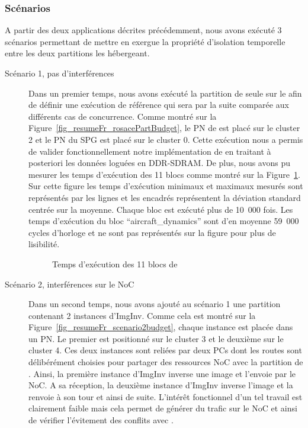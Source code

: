 \documentclass[main.tex]{subfiles}
\begin{document}
\subsubsection{Scénarios}
A partir des deux applications décrites précédemment, nous avons exécuté 3 scénarios permettant de mettre en exergue la propriété d'isolation temporelle entre les deux partitions les hébergeant.
\begin{description}
    \item[Scénario 1, pas d'interférences]
        Dans un premier temps, nous avons exécuté la partition de \rosace seule sur le \mppalong afin de définir une exécution de référence qui sera par la suite comparée aux différents cas de concurrence. Comme montré sur la Figure~\ref{fig_resumeFr_rosacePartBudget}, le PN de \rosace est placé sur le cluster 2 et le PN du SPG est placé sur le cluster 0. Cette exécution nous a permis de valider fonctionnellement notre implémentation de \rosace en traitant à posteriori les données loguées en DDR-SDRAM. De plus, nous avons pu mesurer les temps d'exécution des 11 blocs comme montré sur la Figure~\ref{fig_resumeFr_ETrosace}. Sur cette figure les temps d'exécution minimaux et maximaux mesurés sont représentés par les lignes et les encadrés représentent la déviation standard centrée sur la moyenne. Chaque bloc est exécuté plus de 10~000 fois. Les temps d'exécution du bloc ``aircraft\_dynamics'' sont d'en moyenne 59~000 cycles d'horloge et ne sont pas représentés sur la figure pour plus de lisibilité.

\begin{figure}
    \centering
    \scalebox{1}{}	
    \vspace{-5mm}
    \caption{Temps d'exécution des 11 blocs de \rosace}
	\label{fig_resumeFr_ETrosace}
\end{figure}

    \item[Scénario 2, interférences sur le NoC]
        Dans un second temps, nous avons ajouté au scénario 1 une partition contenant 2 instances d'ImgInv. Comme cela est montré sur la Figure~\ref{fig_resumeFr_scenario2budget}, chaque instance est placée dans un PN. Le premier est positionné sur le cluster 3 et le deuxième sur le cluster 4. Ces deux instances sont reliées par deux PCs dont les routes sont délibérément choisies pour partager des ressources NoC avec la partition de \rosace. Ainsi, la première instance d'ImgInv inverse une image et l'envoie par le NoC. A sa réception, la deuxième instance d'ImgInv inverse l'image et la renvoie à son tour et ainsi de suite. L'intérêt fonctionnel d'un tel travail est clairement faible mais cela permet de générer du trafic sur le NoC et ainsi de vérifier l'évitement des conflits avec \rosace. 


\end{description}
\end{document}

